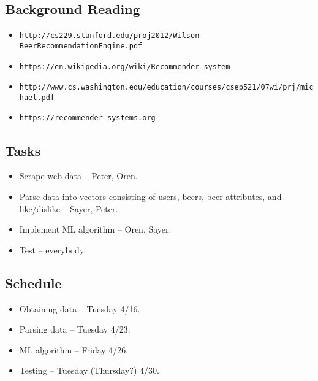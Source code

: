 \documentclass[11pt]{article}
\begin{document}
\subsection*{Background Reading}
\begin{itemize}
\item \verb+http://cs229.stanford.edu/proj2012/Wilson-BeerRecommendationEngine.pdf+
\item \verb+https://en.wikipedia.org/wiki/Recommender_system+
\item \verb+http://www.cs.washington.edu/education/courses/csep521/07wi/prj/michael.pdf+
\item \verb+https://recommender-systems.org+
\end{itemize}
\subsection*{Tasks}
\begin{itemize}
\item Scrape web data -- Peter, Oren.
\item Parse data into vectors consisting of users, beers, beer attributes, and like/dislike -- Sayer, Peter.
\item Implement ML algorithm -- Oren, Sayer.
\item Test -- everybody.
\end{itemize}
\subsection*{Schedule}
\begin{itemize}
\item Obtaining data -- Tuesday 4/16.
\item Parsing data -- Tuesday 4/23.
\item ML algorithm -- Friday 4/26.
\item Testing -- Tuesday (Thursday?) 4/30.
\end{itemize}
\end{document}
